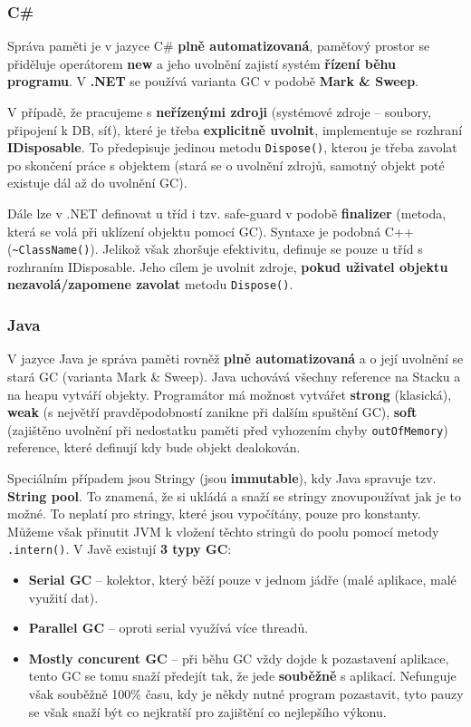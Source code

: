 \subsubsection{C\#}
Správa paměti je v jazyce C\# \textbf{plně automatizovaná}, paměťový prostor se přiděluje operátorem \textbf{new} a jeho uvolnění zajistí systém \textbf{řízení běhu programu}. V \textbf{.NET} se používá varianta GC v podobě \textbf{Mark \& Sweep}.

V případě, že pracujeme s \textbf{neřízenými zdroji} (systémové zdroje -- soubory, připojení k DB, síť), které je třeba \textbf{explicitně uvolnit}, implementuje se rozhraní \textbf{IDisposable}. To předepisuje jedinou metodu \texttt{Dispose()}, kterou je třeba zavolat po skončení práce s objektem (stará se o uvolnění zdrojů, samotný objekt poté existuje dál až do uvolnění GC).

Dále lze v .NET definovat u tříd i tzv. safe-guard v podobě \textbf{finalizer} (metoda, která se volá při uklízení objektu pomocí GC). Syntaxe je podobná C++ (\texttt{\textasciitilde{}ClassName()}). Jelikož však zhoršuje efektivitu, definuje se pouze u tříd s rozhraním IDisposable. Jeho cílem je uvolnit zdroje, \textbf{pokud uživatel objektu nezavolá/zapomene zavolat} metodu \texttt{Dispose()}. 

\subsubsection{Java}
V jazyce Java je správa paměti rovněž \textbf{plně automatizovaná} a o její uvolnění se stará GC (varianta Mark \& Sweep). Java uchovává všechny reference na Stacku a na heapu vytváří objekty. Programátor má možnost vytvářet \textbf{strong} (klasická), \textbf{weak} (s největří pravděpodobností zanikne při dalším spuštění GC), \textbf{soft} (zajištěno uvolnění při nedostatku paměti před vyhozením chyby \texttt{outOfMemory}) reference, které definují kdy bude objekt dealokován.

Speciálním případem jsou Stringy (jsou \textbf{immutable}), kdy Java spravuje tzv. \textbf{String pool}. To znamená, že si ukládá a snaží se stringy znovupoužívat jak je to možné. To neplatí pro stringy, které jsou vypočítány, pouze pro konstanty. Můžeme však přinutit JVM k vložení těchto stringů do poolu pomocí metody \texttt{.intern()}. V Javě existují \textbf{3 typy GC}:
\begin{itemize}
\item \textbf{Serial GC} -- kolektor, který běží pouze v jednom jádře (malé aplikace, malé využití dat).
\item \textbf{Parallel GC} -- oproti serial využívá více threadů.
\item \textbf{Mostly concurent GC} -- při běhu GC vždy dojde k pozastavení aplikace, tento GC se tomu snaží předejít tak, že jede \textbf{souběžně} s aplikací. Nefunguje však souběžně 100\% času, kdy je někdy nutné program pozastavit, tyto pauzy se však snaží být co nejkratší pro zajištění co nejlepšího výkonu.
\end{itemize}

